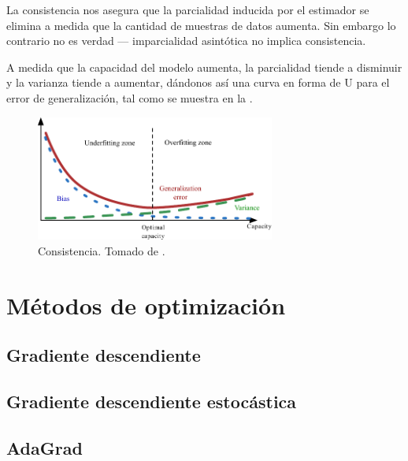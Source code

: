 La consistencia nos asegura que la parcialidad inducida por el estimador se elimina a medida que la cantidad de muestras de datos aumenta. Sin embargo lo contrario no es verdad --- imparcialidad asintótica no implica consistencia.

A medida que la capacidad del modelo aumenta, la parcialidad tiende a disminuir y la varianza tiende a aumentar, dándonos así una curva en forma de U para el error de generalización, tal como se muestra en la .

\begin{figure}[H]
  \centering
  \includegraphics[width=0.7\textwidth]{Figures/consistency.pdf}
  \decoRule
  \caption[Consistencia]{Consistencia. Tomado de \cite{deeplearning}.}
  \label{fig:consistency}
\end{figure}


\section{Métodos de optimización}

\subsection{Gradiente descendiente}

\subsection{Gradiente descendiente estocástica}

\subsection{AdaGrad}

